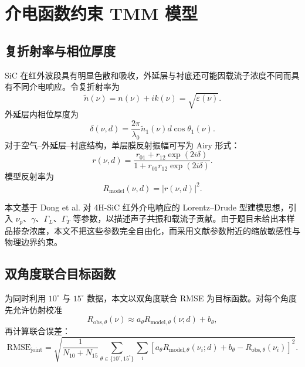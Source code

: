 \documentclass[UTF8,a4paper,12pt]{ctexart}
\begin{document}
\section{介电函数约束 TMM 模型}

\subsection{复折射率与相位厚度}

SiC 在红外波段具有明显色散和吸收，外延层与衬底还可能因载流子浓度不同而具有不同介电响应。令复折射率为
\begin{equation}
\tilde n(\nu)=n(\nu)+ik(\nu)=\sqrt{\varepsilon(\nu)}.
\end{equation}
外延层内相位厚度为
\begin{equation}
\delta(\nu,d)=
\frac{2\pi}{\lambda_0}
\tilde n_1(\nu)d\cos\theta_1(\nu).
\end{equation}
对于空气--外延层--衬底结构，单层膜反射振幅可写为 Airy 形式：
\begin{equation}
r(\nu,d)=
\frac{r_{01}+r_{12}\exp(2i\delta)}
{1+r_{01}r_{12}\exp(2i\delta)}.
\end{equation}
模型反射率为
\begin{equation}
R_{\mathrm{model}}(\nu,d)=|r(\nu,d)|^2.
\end{equation}

本文基于 Dong et al. 对 4H-SiC 红外介电响应的 Lorentz--Drude 型建模思想，引入 $\nu_p$、$\gamma$、$\Gamma_L$、$\Gamma_T$ 等参数，以描述声子共振和载流子贡献。由于题目未给出本样品掺杂浓度，本文不把这些参数完全自由化，而采用文献参数附近的缩放敏感性与物理边界约束。

\subsection{双角度联合目标函数}

为同时利用 $10^\circ$ 与 $15^\circ$ 数据，本文以双角度联合 RMSE 为目标函数。对每个角度先允许仿射校准
\begin{equation}
R_{\mathrm{obs},\theta}(\nu)
\approx
a_\theta R_{\mathrm{model},\theta}(\nu;d)+b_\theta,
\end{equation}
再计算联合误差：
\begin{equation}
\mathrm{RMSE}_{\mathrm{joint}}
=
\sqrt{
\frac{1}{N_{10}+N_{15}}
\sum_{\theta\in\{10^\circ,15^\circ\}}
\sum_i
\left[
a_\theta R_{\mathrm{model},\theta}(\nu_i;d)+b_\theta
-R_{\mathrm{obs},\theta}(\nu_i)
\right]^2}.
\label{eq:rmse}
\end{equation}
\end{document}
